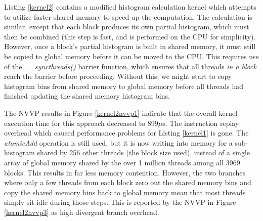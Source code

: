 \documentclass{article}
\begin{document}
Listing \ref{kernel2} contains a modified histogram calculation kernel which attempts to utilize faster shared memory to speed up the computation. The calculation is similar, except that each block produces its own partial histogram, which must then be combined (this step is fast, and is performed on the CPU for simplicity). However, once a block's partial histogram is built in shared memory, it must still be copied to global memory before it can be moved to the CPU. This requires use of the \emph{\_\_syncthreads()} barrier function, which ensures that all threads \emph{in a block} reach the barrier before proceeding. Without this, we might start to copy histogram bins from shared memory to global memory before all threads had finished updating the shared memory histogram bins.

The NVVP results in Figure \ref{kernel2nvvp1} indicate that the overall kernel execution time for this approach decreased to 899$\mu$s. The instruction replay overhead which caused performance problems for Listing \ref{kernel1} is gone. The \emph{atomicAdd} operation is still used, but it is now writing into memory for a sub-histogram shared by 256 other threads (the block size used), instead of a single array of global memory shared by the over 1 million threads among all 3969 blocks. This results in far less memory contention. However, the two branches where only a few threads from each block zero out the shared memory bins and copy the shared memory bins back to global memory mean that most threads simply sit idle during those steps. This is reported by the NVVP in Figure \ref{kernel2nvvp3} as high divergent branch overhead.
\end{document}

